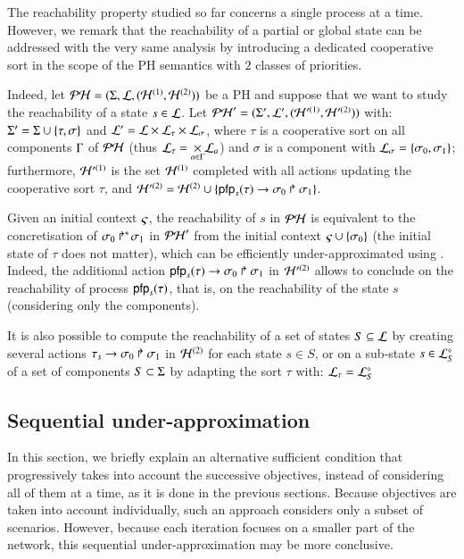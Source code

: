 \newcommand{\total}{\tau}
\newcommand{\reach}{\sigma}

The reachability property studied so far concerns a single process at a time.
However, we remark that the reachability of a partial or global state can be
addressed with the very same analysis by introducing a dedicated cooperative
sort in the scope of the PH semantics with $2$ classes of priorities.

Indeed, let $\PH = (\PHs, \PHl, (\PHh^{(1)}, \PHh^{(2)}))$ be a PH and suppose that we want to study the reachability of a state $s \in \PHl$.
Let $\PH' = (\PHs', \PHl', (\PHh'^{(1)}, \PHh'^{(2)}))$
with: $\PHs' = \PHs \cup \{ \total, \reach \}$ and $\PHl' = \PHl \times \PHl_\total \times \PHl_\reach$,
where $\total$ is a cooperative sort on all components $\components$ of $\PH$ (thus $\PHl_\total = \underset{a \in \components}{\times} \PHl_a$)
and $\reach$ is a component with $\PHl_\reach = \{ \reach_0, \reach_1 \}$;
furthermore, $\PHh'^{(1)}$ is the set $\PHh^{(1)}$ completed with all actions updating the cooperative sort $\total$,
and $\PHh'^{(2)} = \PHh^{(2)} \cup \{ \PHhit{\pfp_s(\total)}{\reach_0}{\reach_1} \}$.

Given an initial context $\ctx$, the reachability of $s$ in $\PH$ is equivalent to the concretisation of $\PHobjp{\reach}{0}{1}$ in $\PH'$ from the initial context $\ctx \cup \{ \reach_0 \}$ (the initial state of $\total$ does not matter), which can be efficiently under-approximated using .
Indeed, the additional action $\PHhit{\pfp_s(\total)}{\reach_0}{\reach_1}$ in $\PHh'^{(2)}$ allows to conclude on the reachability of process $\pfp_s(\total)$, that is, on the reachability of the state $s$ (considering only the components).

It is also possible to compute the reachability of a set of states $S \subseteq \PHl$ by creating several actions $\PHhit{\total_s}{\reach_0}{\reach_1}$ in $\PHh^{(2)}$ for each state $s \in S$,
or on a sub-state $s \in \PHsubl[\PHl]_S$ of a set of components $S \subset \PHs$ by adapting the sort $\total$ with: $\PHl_\total = \PHsubl[\PHl]_S$


\subsection{Sequential under-approximation}
\label{ssec:ordered-ua}

In this section, we briefly explain an alternative sufficient condition that
progressively takes into account the successive objectives, instead of
considering all of them at a time, as it is done in the previous sections.
Because objectives are taken into account individually, such an approach
considers only a subset of scenarios.
However, because each iteration focuses on a smaller part of the network, this
sequential under-approximation may be more conclusive.

